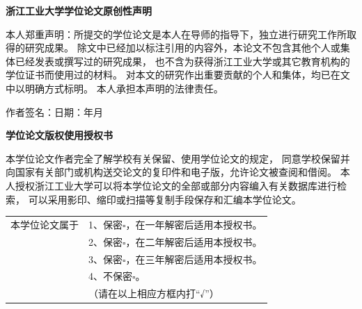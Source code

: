 
\clearpage
\thispagestyle{empty}
{ 
    \vspace*{24bp}
    \begin{center}
      \heiti\textbf{浙江工业大学学位论文原创性声明}
    \end{center}
    
    \doublespacing{}
    本人郑重声明：所提交的学位论文是本人在导师的指导下，独立进行研究工作所取得的研究成果。
    除文中已经加以标注引用的内容外，本论文不包含其他个人或集体已经发表或撰写过的研究成果，
    也不含为获得浙江工业大学或其它教育机构的学位证书而使用过的材料。
    对本文的研究作出重要贡献的个人和集体，均已在文中以明确方式标明。
    本人承担本声明的法律责任。
    
    作者签名：\hfill 日期：\fillYear 年\fillMonth 月 \hspace*{6em}
    
    \vspace*{24bp}
    \begin{center}
    \heiti\textbf{学位论文版权使用授权书}
    \end{center}
    
    \doublespacing{}
    本学位论文作者完全了解学校有关保留、使用学位论文的规定，
    同意学校保留并向国家有关部门或机构送交论文的复印件和电子版，允许论文被查阅和借阅。
    本人授权浙江工业大学可以将本学位论文的全部或部分内容编入有关数据库进行检索，
    可以采用影印、缩印或扫描等复制手段保存和汇编本学位论文。
    
    \begin{table}[!h]
      \renewcommand\arraystretch{1.5}
      \begin{tabular}{ll}
        \hspace{1.5em}本学位论文属于 & 1、保密$\square$，在一年解密后适用本授权书。\\
        & 2、保密$\square$，在二年解密后适用本授权书。 \\
        & 3、保密$\square$，在三年解密后适用本授权书。 \\
        & 4、不保密$\square$。 \\
        & （请在以上相应方框内打“√”） \\
      \end{tabular}
    \end{table}
    
}
